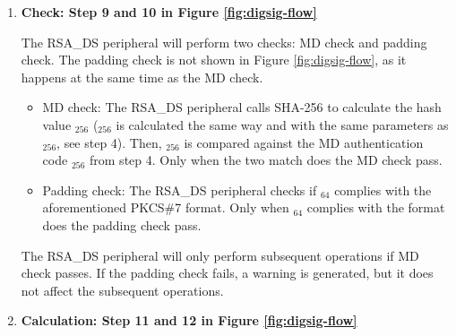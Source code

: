 \documentclass[main\_\_EN.tex]{subfiles}
\begin{document}
\begin{enumerate}
    \item {\bfseries Check: Step 9 and 10 in Figure \ref{fig:digsig-flow}}

        The RSA\_DS peripheral will perform two checks: MD check and padding check. The padding check is not shown in Figure \ref{fig:digsig-flow}, as it happens at the same time as the MD check.

        \begin{itemize}

            \item MD check: The RSA\_DS peripheral calls SHA-256 to calculate the hash value \begin{math}[CALC\_MD]_{256}\end{math} (\begin{math}[CALC\_MD]_{256}\end{math} is calculated the same way and with the same parameters as \begin{math}[MD]_{256}\end{math}, see step 4). Then, \begin{math}[CALC\_MD]_{256}\end{math} is compared against the MD authentication code \begin{math}[MD]_{256}\end{math} from step 4. Only when the two match does the MD check pass.

            \item Padding check: The RSA\_DS peripheral checks if \begin{math}[\beta]_{64} \end{math} complies with the aforementioned PKCS\#7 format. Only when \begin{math}[\beta]_{64} \end{math} complies with the format does the padding check pass.

        \end{itemize}

        The RSA\_DS peripheral will only perform subsequent operations if MD check passes. If the padding check fails, a warning is generated, but it does not affect the subsequent operations.

    \item {\bfseries Calculation: Step 11 and 12 in Figure \ref{fig:digsig-flow}}


\end{enumerate}
\end{document}
